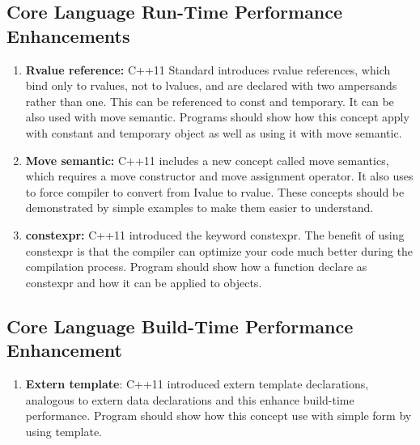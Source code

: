 \documentclass[11pt]{report}
\begin{document}
\subsection{Core Language Run-Time Performance Enhancements}
\begin{enumerate}

\item \textbf{Rvalue reference:} C++11 Standard introduces rvalue references, which bind only to rvalues, not
to lvalues, and are declared with two ampersands rather than one. This can be referenced to const and temporary. It can be also used with move semantic. Programs should show how this concept apply with constant and temporary object as well as using it with move semantic.

\item \textbf{Move semantic:} C++11 includes a new concept called move \linebreak semantics, which requires a move constructor and move assignment \linebreak operator. It also uses to force compiler to convert from Ivalue to rvalue. These concepts should be demonstrated by simple examples to make them easier to understand.

\item \textbf{constexpr:} C++11 introduced the keyword constexpr. The benefit of using constexpr is that the compiler can optimize your code much better during the compilation process. Program should show how a function declare as constexpr and how it can  be applied to objects.
\end{enumerate}


\subsection{Core Language Build-Time Performance Enhancement}
\begin{enumerate}

\item \textbf{Extern template}:  C++11 introduced extern template declarations, analogous to extern data declarations and this enhance build-time \linebreak performance. Program should show how this concept use with simple form by using template.
\end{enumerate}
\end{document}
